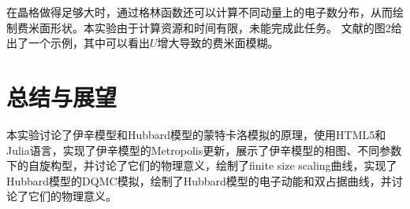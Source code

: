 \documentclass[UTF8]{ctexart}
\begin{document}
在晶格做得足够大时，通过格林函数还可以计算不同动量上的电子数分布，从而绘制费米面形状。本实验由于计算资源和时间有限，未能完成此任务。
文献\cite{varney2009quantum}的图2给出了一个示例，其中可以看出$U$增大导致的费米面模糊。

\section{总结与展望}

本实验讨论了伊辛模型和Hubbard模型的蒙特卡洛模拟的原理，使用HTML5和Julia语言，实现了伊辛模型的Metropolis更新，展示了伊辛模型的相图、不同参数下的自旋构型，并讨论了它们的物理意义，绘制了finite size scaling曲线，实现了Hubbard模型的DQMC模拟，绘制了Hubbard模型的电子动能和双占据曲线，并讨论了它们的物理意义。



\end{document}

